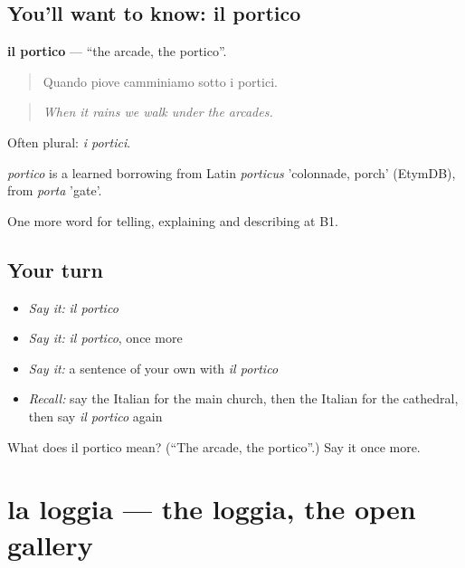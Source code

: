 \subsection*{You'll want to know: il portico}
\textbf{il portico} — \textquotedblleft{}the arcade, the portico\textquotedblright{}.

\begin{quote}
Quando piove camminiamo sotto i portici.
\end{quote}

\begin{quote}
\emph{When it rains we walk under the arcades.}
\end{quote}

Often plural: \emph{i portici}.

\begin{cousinweb}
\emph{portico} is a learned borrowing from Latin \emph{porticus} 'colonnade, porch' (EtymDB), from \emph{porta} 'gate'.
\end{cousinweb}

\begin{grammarlens}[title={What you've built}]
One more word for telling, explaining and describing at B1.
\end{grammarlens}

\subsection*{Your turn}
\begin{itemize}
\raggedright
  \item \emph{Say it:} \emph{il portico}
  \item \emph{Say it:} \emph{il portico}, once more
  \item \emph{Say it:} a sentence of your own with \emph{il portico}
  \item \emph{Recall:} say the Italian for the main church, then the Italian for the cathedral, then say \emph{il portico} again
\end{itemize}

\begin{tcolorbox}[breakable,colback=teal!4,colframe=teal!35!black,title={Before you move on}]
What does il portico mean? (\textquotedblleft{}The arcade, the portico\textquotedblright{}.) Say it once more.
\end{tcolorbox}
\section[la loggia]{la loggia — the loggia, the open gallery}

